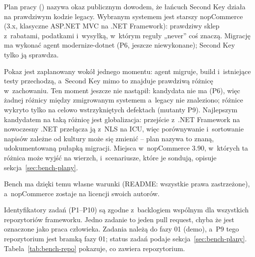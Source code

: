 Plan pracy () nazywa okaz publicznym dowodem, że łańcuch
Second Key działa na prawdziwym kodzie legacy. Wybranym systemem jest starszy nopCommerce
(3.x, klasyczne ASP.NET MVC na .NET Framework): prawdziwy sklep z~rabatami, podatkami
i~wysyłką, w~którym reguły „never” coś znaczą. Migrację ma wykonać agent modernize-dotnet
(P6, jeszcze niewykonane); Second Key tylko ją sprawdza.

Pokaz jest zaplanowany wokół jednego momentu: agent migruje, build i~istniejące testy
przechodzą, a~Second Key mimo to znajduje prawdziwą różnicę w~zachowaniu. Ten moment jeszcze
nie nastąpił: kandydata nie ma (P6), więc żadnej różnicy między zmigrowanym systemem
a~legacy nie znaleziono; różnice wykryto tylko na celowo wstrzykniętych defektach
(mutanty P9). Najlepszym
kandydatem na taką różnicę jest globalizacja: przejście z~.NET Framework na nowoczesny
.NET przełącza ją z~NLS na ICU, więc porównywanie i~sortowanie napisów zależne od kultury
może się zmienić -- plan nazywa to znaną, udokumentowaną pułapką migracji. Miejsca
w~nopCommerce 3.90, w~których ta różnica może wyjść na wierzch, i~scenariusze, które je
sondują, opisuje sekcja~\ref{sec:bench-plany}.

 Bench ma dzięki temu własne warunki (README: wszystkie prawa
zastrzeżone), a~nopCommerce zostaje na licencji swoich autorów.

Identyfikatory zadań (P1--P10) są zgodne z~backlogiem wspólnym dla wszystkich
repozytoriów frameworku. Jedno zadanie to jeden pull request, chyba że jest oznaczone jako praca człowieka.
Zadania należą do fazy 01 (demo), a~P9 tego repozytorium jest bramką fazy 01; status
zadań podaje sekcja~\ref{sec:bench-plany}. Tabela~\ref{tab:bench-repo} pokazuje, co
zawiera repozytorium.

